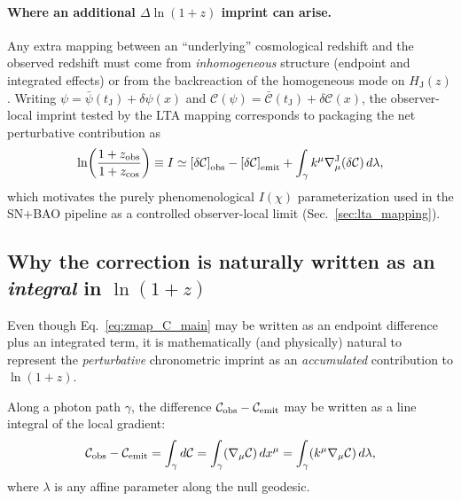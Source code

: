\documentclass[10pt]{article}
\newcommand{\zobs}{z_{\mathrm{obs}}}
\newcommand{\zcos}{z_{\mathrm{cos}}}
\newcommand{\HJ}{H_{\mathrm{J}}}
\newcommand{\tJ}{t_{\mathrm{J}}}
\newcommand{\Apsi}{A(\psi)}
\newcommand{\Cpsi}{\mathcal{C}(\psi)} %
\begin{document}
\paragraph{Where an additional \(\Delta\ln(1+z)\) imprint can arise.}
Any extra mapping between an ``underlying'' cosmological redshift and the observed redshift must come
from \emph{inhomogeneous} structure (endpoint and integrated effects) or from the backreaction of the
homogeneous mode on \(\HJ(z)\). Writing
\(\psi=\bar\psi(\tJ)+\delta\psi(x)\) and \(\Cpsi=\bar{\mathcal{C}}(\tJ)+\delta\mathcal{C}(x)\), the observer-local imprint
tested by the LTA mapping corresponds to packaging the net perturbative contribution as
\begin{equation}
\ln\!\left(\frac{1+\zobs}{1+\zcos}\right)
\equiv I
\simeq
\left[\delta\mathcal{C}\right]_{\rm obs}-\left[\delta\mathcal{C}\right]_{\rm emit}
+\int_\gamma k^\mu \nabla^{\mathrm{J}}_\mu(\delta\mathcal{C})\,d\lambda,
\label{eq:zmap_C_main}
\end{equation}
which motivates the purely phenomenological \(I(\chi)\) parameterization used in the SN+BAO pipeline
as a controlled observer-local limit (Sec.~\ref{sec:lta_mapping}).

\subsection{Why the correction is naturally written as an \emph{integral} in $\ln(1+z)$}
\label{sec:photon_transport_integrated}

Even though Eq.~\eqref{eq:zmap_C_main} may be written as an endpoint difference plus an integrated
term, it is mathematically (and physically) natural to represent the \emph{perturbative} chronometric
imprint as an \emph{accumulated} contribution to \(\ln(1+z)\).

Along a photon path \(\gamma\), the difference
\(\mathcal{C}_{\rm obs}-\mathcal{C}_{\rm emit}\) may be written as a line integral of the local
gradient:
\begin{equation}
\mathcal{C}_{\rm obs}-\mathcal{C}_{\rm emit}
=
\int_{\gamma} d\mathcal{C}
=
\int_{\gamma} (\nabla_\mu \mathcal{C})\,dx^\mu
=
\int_{\gamma} (k^\mu \nabla_\mu \mathcal{C})\,d\lambda,
\label{eq:C_line_integral}
\end{equation}
where \(\lambda\) is any affine parameter along the null geodesic.
\end{document}
